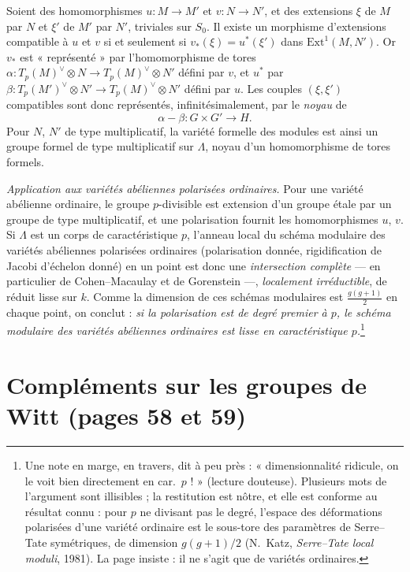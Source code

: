 \documentclass[11pt,a4paper]{article}
\begin{document}
Soient des homomorphismes $u : M \to M'$ et $v : N \to N'$, et des extensions
$\xi$ de $M$ par $N$ et $\xi'$ de $M'$ par $N'$, triviales sur $S_0$. Il existe
un morphisme d'extensions compatible à $u$ et $v$ si et seulement si
$v_*(\xi) = u^*(\xi')$ dans $\mathrm{Ext}^1(M, N')$. Or $v_*$ est
« représenté » par l'homomorphisme de tores
$\alpha : T_p(M)^\vee \otimes N \to T_p(M)^\vee \otimes N'$ défini par $v$, et
$u^*$ par $\beta : T_p(M')^\vee \otimes N' \to T_p(M)^\vee \otimes N'$ défini par
$u$. Les couples $(\xi, \xi')$ compatibles sont donc représentés,
infinitésimalement, par le \emph{noyau} de
\[
  \alpha - \beta : G \times G' \longrightarrow H .
\]
Pour $N$, $N'$ de type multiplicatif, la variété formelle des modules est
ainsi un groupe formel de type multiplicatif sur $\Lambda$, noyau d'un
homomorphisme de tores formels.

\emph{Application aux variétés abéliennes polarisées ordinaires.} Pour une
variété abélienne ordinaire, le groupe $p$-divisible est extension d'un groupe
étale par un groupe de type multiplicatif, et une polarisation fournit les
homomorphismes $u$, $v$. Si $\Lambda$ est un corps de caractéristique $p$,
l'anneau local du schéma modulaire des variétés abéliennes polarisées
ordinaires (polarisation donnée, rigidification de Jacobi d'échelon donné) en
un point est donc une \emph{intersection complète} — en particulier de
Cohen--Macaulay et de Gorenstein —, \emph{localement irréductible}, de
réduit lisse sur $k$. Comme la dimension de ces schémas modulaires est
$\tfrac{g(g+1)}{2}$ en chaque point, on conclut : \emph{si la polarisation est
de degré premier à $p$, le schéma modulaire des variétés abéliennes ordinaires
est lisse en caractéristique $p$.}\footnote{Une note en marge, en travers, dit à
peu près : « dimensionnalité ridicule, on le voit bien directement en
car.~$p$ ! » (lecture douteuse). Plusieurs mots de l'argument sont illisibles ;
la restitution est nôtre, et elle est conforme au résultat connu : pour $p$ ne
divisant pas le degré, l'espace des déformations polarisées d'une variété
ordinaire est le sous-tore des paramètres de Serre--Tate symétriques, de
dimension $g(g+1)/2$ (N.~Katz, \emph{Serre--Tate local moduli}, 1981). La
page insiste : il ne s'agit que de variétés ordinaires.}

\section*{Compléments sur les groupes de Witt (pages 58 et 59)}
\end{document}
